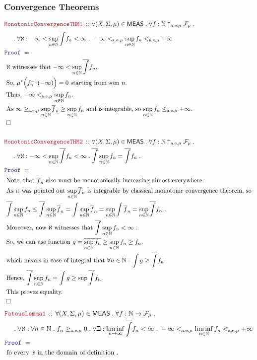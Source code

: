 \documentclass[12pt]{scrartcl}
\newcommand{\LOGIC}[1]{\textcolor{Blue}{\mathtt{#1}}}
\newcommand{\THM}[1]{\textcolor{Maroon}{\mathtt{#1}}}
\renewcommand{\.}{\; . \;}
\newcommand{\Theorem}[2]{& \THM{#1} \, :: \, #2 \\ & \Proof = \\ }
\newcommand{\NewLine}{\\ & \kern 1pc}
\newcommand{\Page}[1]{ \begin{align*} #1 \end{align*}   }
\newcommand{\Nat}{\mathbb{N} }
\newcommand{\QED}{\; \square}
\newcommand{\EndProof}{& \QED \\}
\newcommand{\Proof}{\LOGIC{Proof} \; }
\newcommand{\Explain}[1]{& \text{#1.} \\}
\newcommand{\ExplainFurther}[1]{& \text{#1} \\}
\renewcommand{\ae}{\mathrm{a.e.}}
\newcommand{\F}{\mathcal{F}}
\newcommand{\MEAS}{\mathsf{MEAS}}
\begin{document}
\subsubsection{Convergence Theorems}
\Page{
	\Theorem{MonotonicConvergenceTHM1}
	{
		\forall (X,\Sigma,\mu) \in \MEAS \.
		\forall f : \Nat \uparrow_{\ae \mu} \F_\mu \. \NewLine \.
		\forall \aleph :  -\infty < \sup_{n \in \Nat} \overline{\int} f_n < \infty \.
		-\infty <_{\ae \mu} \sup_{n \in \Nat}  f_n <_{\ae \mu} +\infty 
	}
	\Explain{
		$\aleph$ witnesses that $ -\infty < \sup_{n \in \Nat} \overline{\int} f_n$}
	\Explain{
		So, $\mu^*\Big( f^{-1}_n(-\infty) \Big) = 0$ starting from som $n$}
	\Explain{ 
		Thus, $-\infty <_{\ae \mu} \sup_{n \in \Nat}  f_n $}
	\Explain{
		As $\infty \ge_{\ae {\mu}} \sup_{n \in \Nat} \overline{f}_n \ge \sup_{n \in \Nat} f_n$ and is integrable,  
		so $\sup_{n \in \Nat}  f_n \le_{\ae \mu} + \infty$}
	\EndProof
	\\
	\Theorem{MonotonicConvergenceTHM2}
	{
		\forall (X,\Sigma,\mu) \in \MEAS \.
		\forall f : \Nat \uparrow_{\ae \mu} \F_\mu \. \NewLine \.
		\forall \aleph :  -\infty < \sup_{n \in \Nat} \overline{\int} f_n < \infty \.
		\overline{\int} \sup_{n \in \Nat}  f_n  =  \overline{\int} f_n  \.
	}
	\Explain{ 
		Note, that  $\overline{f}_n$ also must be monotonically increasing almost everywhere}
	\ExplainFurther{
		As it was pointed out $\sup_{n \in \Nat} \overline{f}_n$ is integrable by classical monotonic convergence 
		theorem, so   
	}
	\Explain{
		$
			\overline{\int} \sup_{n \in \Nat} f_n \le 
			\overline{\int} \sup_{n \in \Nat} \overline{f}_n = 
			\int \sup_{n \in \Nat} \overline{f}_n =
			\sup_{n \in \Nat} \int \overline{f}_n =
			\sup_{n \in \Nat} \overline{\int} f_n 
		$
	}
	\Explain{
		Moreover, now $\aleph$ witnesses that
		$\overline{\int} \sup_{n \in \Nat} f_n < \infty$
	}
	\Explain{
		So, we can use function $g = \overline{\sup_{n \in \Nat} f_n} \ge \sup_{n \in \Nat} f_n \ge f_n$}	
	\Explain{
		which means in case of integral that $\forall n \in \Nat \. \int g \ge \overline{\int} f_n$}	
	\Explain{
		Hence,
		$
			\overline{\int} \sup_{n \in \Nat} f_n = 
			\int g \ge \sup \overline{\int} f_n
		$}
	\Explain{
		This proves equality}
	\EndProof
}\Page{
	\Theorem{FatousLemma1}
	{
		\forall (X,\Sigma,\mu) \in \MEAS \.
		\forall f : \Nat \to \F_\mu \. \NewLine \.
		\forall \aleph :  \forall n \in \Nat \. f_n \ge_{\ae \mu} 0 \.
		\forall \beth : \liminf_{n \to \infty} \overline{\int} f_n < \infty \.
		-\infty <_{\ae \mu} \liminf_{n \in \Nat}  f_n <_{\ae \mu} +\infty 
	}
	\Explain{ fo every $x$ in the domain of definition 
}}
\end{document}
